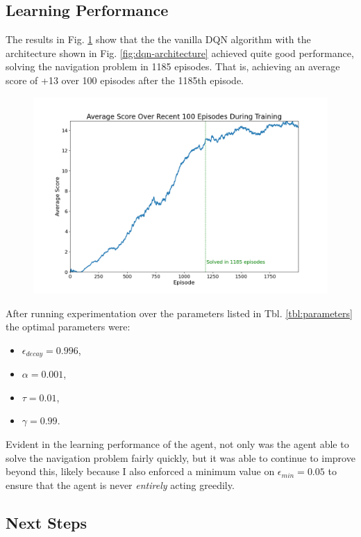 \documentclass[11pt]{article}
\begin{document}
\subsection{Learning Performance}

The results in Fig. \ref{fig:dqn-results} show that the the vanilla DQN
algorithm with the architecture shown in Fig. \ref{fig:dqn-architecture} achieved 
quite good performance, solving the navigation problem in 1185 episodes. That is, 
achieving an average score of +13 over 100 episodes after the 1185th episode.

\FloatBarrier

\begin{figure}[!ht]
	\centering
	\includegraphics[width=0.8\linewidth]{images/dqn-results.png}
	\caption{}
	\label{fig:dqn-results}
\end{figure}

\FloatBarrier

After running experimentation over the parameters listed in Tbl. \ref{tbl:parameters} 
the optimal parameters were:
\begin{itemize}
	\item $\epsilon_{decay} = 0.996$,
	\item $\alpha = 0.001$,
	\item $\tau = 0.01$,
	\item $\gamma = 0.99$.
\end{itemize}

Evident in the learning performance of the agent, not only was the agent able to 
solve the navigation problem fairly quickly, but it was able to continue to improve 
beyond this, likely because I also enforced a minimum value on $\epsilon_{min} = 0.05$ 
to ensure that the agent is never \textit{entirely} acting greedily.

\subsection{Next Steps}
\end{document}
